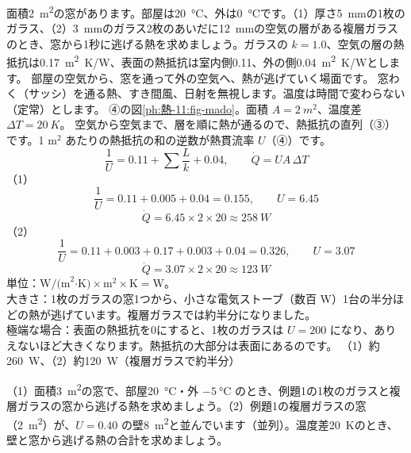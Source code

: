 \label{ph:熱-11:ex1}
\begin{phreidai}[1枚のガラスと複層ガラスの窓]
面積\qty{2}{m^2}の窓があります。部屋は\qty{20}{\celsius}、外は\qty{0}{\celsius}です。（1）厚さ\qty{5}{mm}の1枚のガラス、（2）\qty{3}{mm}のガラス2枚のあいだに\qty{12}{mm}の空気の層がある複層ガラスのとき、窓から1秒に逃げる熱を求めましょう。ガラスの $k=1.0$、空気の層の熱抵抗は\qty{0.17}{m^2.K/W}、表面の熱抵抗は室内側0.11、外の側\qty{0.04}{m^2.K/W}とします。
\phbamen
部屋の空気から、窓を通って外の空気へ、熱が逃げていく場面です。
\phmushi
窓わく（サッシ）を通る熱、すき間風、日射を無視します。温度は時間で変わらない（定常）とします。
\phzu
④の図\ref{ph:熱-11:fig-mado}。面積 $A=\qty{2}{m^2}$、温度差 $\Delta T=\qty{20}{K}$。
\phriyu
空気から空気まで、層を順に熱が通るので、熱抵抗の直列（③）です。1 m$^2$ あたりの熱抵抗の和の逆数が熱貫流率 $U$（④）です。
\phtateru
\[\frac{1}{U}=0.11+\sum\frac{L}{k}+0.04,\qquad\dot Q=UA\,\Delta T\]
\phtoku
（1）\[\frac{1}{U}=0.11+0.005+0.04=0.155,\qquad U=6.45\]
\[\dot Q=6.45\times2\times20\approx\qty{258}{W}\]
（2）\[\frac{1}{U}=0.11+0.003+0.17+0.003+0.04=0.326,\qquad U=3.07\]
\[\dot Q=3.07\times2\times20\approx\qty{123}{W}\]
\phtashikame
単位：$\text{W/(m}^2\text{·K)}\times\text{m}^2\times\text{K}=\text{W}$。\\
大きさ：1枚のガラスの窓1つから、小さな電気ストーブ（数百 W）1台の半分ほどの熱が逃げています。複層ガラスでは約半分になりました。\\
極端な場合：表面の熱抵抗を0にすると、1枚のガラスは $U=200$ になり、ありえないほど大きくなります。熱抵抗の大部分は表面にあるのです。
\kotae （1）約\qty{260}{W}、（2）約\qty{120}{W}（複層ガラスで約半分）
\end{phreidai}
\begin{jibun}
（1）面積\qty{3}{m^2}の窓で、部屋\qty{20}{\celsius}・外 $\qty{-5}{\celsius}$ のとき、例題1の1枚のガラスと複層ガラスの窓から逃げる熱を求めましょう。（2）例題1の複層ガラスの窓（\qty{2}{m^2}）が、$U=0.40$ の壁\qty{8}{m^2}と並んでいます（並列）。温度差\qty{20}{K}のとき、壁と窓から逃げる熱の合計を求めましょう。
\end{jibun}

